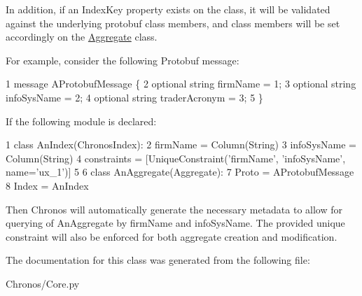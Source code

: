 In addition, if an Index\+Key property exists on the class, it will be validated against the underlying protobuf class members, and class members will be set accordingly on the \hyperlink{classChronos_1_1Core_1_1Aggregate}{Aggregate} class.

For example, consider the following Protobuf message\+: 
\begin{DoxyCode}
1 message AProtobufMessage \{
2     optional string firmName = 1;
3     optional string infoSysName = 2;
4     optional string traderAcronym = 3;
5 \}
\end{DoxyCode}


If the following module is declared\+: 
\begin{DoxyCode}
1 \textcolor{keyword}{class }AnIndex(ChronosIndex):
2     firmName = Column(String)
3     infoSysName = Column(String)
4     constraints = [UniqueConstraint(\textcolor{stringliteral}{'firmName'}, \textcolor{stringliteral}{'infoSysName'}, name=\textcolor{stringliteral}{'ux\_1'})]
5 
6 \textcolor{keyword}{class }AnAggregate(Aggregate):
7     Proto = AProtobufMessage
8     Index = AnIndex
\end{DoxyCode}


Then Chronos will automatically generate the necessary metadata to allow for querying of An\+Aggregate by firm\+Name and info\+Sys\+Name. The provided unique constraint will also be enforced for both aggregate creation and modification. 

The documentation for this class was generated from the following file\+:\begin{DoxyCompactItemize}
\item 
Chronos/Core.\+py\end{DoxyCompactItemize}
